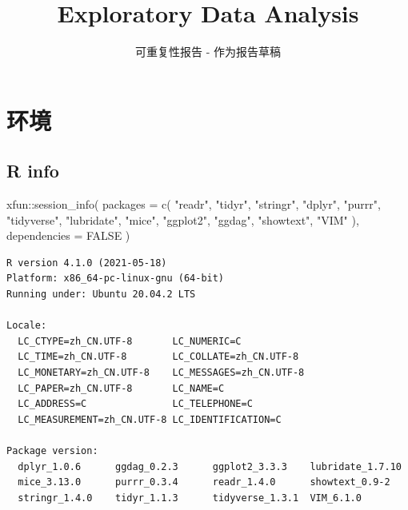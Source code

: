 \documentclass[
]{ctexart}
\title{Exploratory Data Analysis}
\subtitle{可重复性报告 - 作为报告草稿}
\author{}
\date{\vspace{-2.5em}}
\newenvironment{Shaded}{\begin{snugshade}}{\end{snugshade}}
\newcommand{\AttributeTok}[1]{\textcolor[rgb]{0.77,0.63,0.00}{#1}}
\newcommand{\ConstantTok}[1]{\textcolor[rgb]{0.00,0.00,0.00}{#1}}
\newcommand{\FunctionTok}[1]{\textcolor[rgb]{0.00,0.00,0.00}{#1}}
\newcommand{\NormalTok}[1]{#1}
\newcommand{\SpecialCharTok}[1]{\textcolor[rgb]{0.00,0.00,0.00}{#1}}
\newcommand{\StringTok}[1]{\textcolor[rgb]{0.31,0.60,0.02}{#1}}
\begin{document}
\maketitle

{
\setcounter{tocdepth}{2}
\tableofcontents
}
\hypertarget{ux73afux5883}{%
\section{环境}\label{ux73afux5883}}

\hypertarget{r-info}{%
\subsection{R info}\label{r-info}}

\begin{Shaded}
\begin{Highlighting}[]
\NormalTok{xfun}\SpecialCharTok{::}\FunctionTok{session\_info}\NormalTok{(}
        \AttributeTok{packages =} \FunctionTok{c}\NormalTok{(}
                \StringTok{"readr"}\NormalTok{, }\StringTok{"tidyr"}\NormalTok{, }\StringTok{"stringr"}\NormalTok{, }\StringTok{"dplyr"}\NormalTok{, }\StringTok{"purrr"}\NormalTok{,}
                \StringTok{"tidyverse"}\NormalTok{, }\StringTok{"lubridate"}\NormalTok{, }\StringTok{"mice"}\NormalTok{,}
                \StringTok{"ggplot2"}\NormalTok{, }\StringTok{"ggdag"}\NormalTok{, }\StringTok{"showtext"}\NormalTok{, }\StringTok{"VIM"}
\NormalTok{        ), }\AttributeTok{dependencies =} \ConstantTok{FALSE}
\NormalTok{)}
\end{Highlighting}
\end{Shaded}

\begin{verbatim}
R version 4.1.0 (2021-05-18)
Platform: x86_64-pc-linux-gnu (64-bit)
Running under: Ubuntu 20.04.2 LTS

Locale:
  LC_CTYPE=zh_CN.UTF-8       LC_NUMERIC=C              
  LC_TIME=zh_CN.UTF-8        LC_COLLATE=zh_CN.UTF-8    
  LC_MONETARY=zh_CN.UTF-8    LC_MESSAGES=zh_CN.UTF-8   
  LC_PAPER=zh_CN.UTF-8       LC_NAME=C                 
  LC_ADDRESS=C               LC_TELEPHONE=C            
  LC_MEASUREMENT=zh_CN.UTF-8 LC_IDENTIFICATION=C       

Package version:
  dplyr_1.0.6      ggdag_0.2.3      ggplot2_3.3.3    lubridate_1.7.10
  mice_3.13.0      purrr_0.3.4      readr_1.4.0      showtext_0.9-2  
  stringr_1.4.0    tidyr_1.1.3      tidyverse_1.3.1  VIM_6.1.0       
\end{verbatim}
\end{document}
